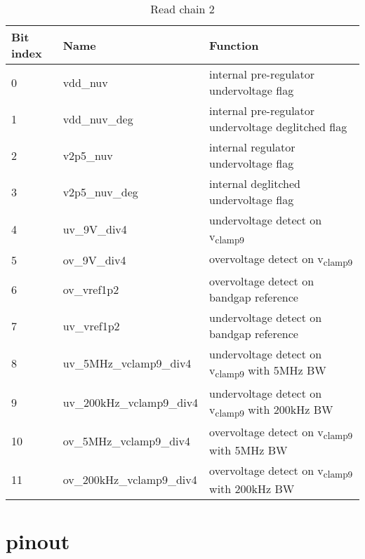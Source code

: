 \begin{table}[!htbp]
\centering
\begin{tabular}{@{}lll@{}}
\toprule
Bit index & Name & Function \\ \toprule
0	& vdd\_nuv       & internal pre-regulator undervoltage flag \\
1	& vdd\_nuv\_deg  & internal pre-regulator undervoltage deglitched flag \\
2	& v2p5\_nuv	     & internal regulator undervoltage flag \\
3	& v2p5\_nuv\_deg & internal deglitched undervoltage flag \\
4	& uv\_9V\_div4	 & undervoltage detect on v\textsubscript{clamp9} \\
5	& ov\_9V\_div4	 & overvoltage detect on v\textsubscript{clamp9} \\
6	& ov\_vref1p2	   & overvoltage detect on bandgap reference \\
7	& uv\_vref1p2	   & undervoltage detect on bandgap reference \\
8	&	uv\_5MHz\_vclamp9\_div4  & undervoltage detect on v\textsubscript{clamp9} with 5MHz BW \\
9	&	uv\_200kHz\_vclamp9\_div4 & undervoltage detect on v\textsubscript{clamp9} with 200kHz BW \\
10&	ov\_5MHz\_vclamp9\_div4 & overvoltage detect on v\textsubscript{clamp9} with 5MHz BW\\
11&	ov\_200kHz\_vclamp9\_div4 & overvoltage detect on v\textsubscript{clamp9} with 200kHz BW\\
\bottomrule
\end{tabular}
\caption{Read chain 2}
\label{tab:read-chain-2}
\end{table}

\section{pinout}
\label{apx:testchip-pinout}


